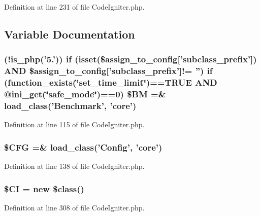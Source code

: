 Definition at line 231 of file Code\-Igniter.\-php.



\subsection{Variable Documentation}
\hypertarget{_code_igniter_8php_a00c84dd4b16006bcf296997b833ebfac}{
\subsubsection[{\$\-B\-M}]{ (!is\-\_\-php('5.')) {\bf if} (isset(\$assign\-\_\-to\-\_\-config\mbox{[}'subclass\-\_\-prefix'\mbox{]}) A\-N\-D \$assign\-\_\-to\-\_\-config\mbox{[}'subclass\-\_\-prefix'\mbox{]}!= '') {\bf if} (function\-\_\-exists(\char`\"{}set\-\_\-time\-\_\-limit\char`\"{})==T\-R\-U\-E A\-N\-D @ini\-\_\-get(\char`\"{}safe\-\_\-mode\char`\"{})==0) \$B\-M =\& load\-\_\-class('Benchmark', 'core')}}\label{_code_igniter_8php_a00c84dd4b16006bcf296997b833ebfac}


Definition at line 115 of file Code\-Igniter.\-php.

\hypertarget{_code_igniter_8php_adb9373e11e42b2cd55d1fe249ae72deb}{
\subsubsection[{\$\-C\-F\-G}]{\setlength{\rightskip}{0pt plus 5cm}\$C\-F\-G =\& load\-\_\-class('Config', 'core')}}\label{_code_igniter_8php_adb9373e11e42b2cd55d1fe249ae72deb}


Definition at line 138 of file Code\-Igniter.\-php.

\hypertarget{_code_igniter_8php_ae0314d046ddf7fcfaec03222977427d3}{
\subsubsection[{\$\-C\-I}]{\setlength{\rightskip}{0pt plus 5cm}\$C\-I = new \$class()}}\label{_code_igniter_8php_ae0314d046ddf7fcfaec03222977427d3}


Definition at line 308 of file Code\-Igniter.\-php.

